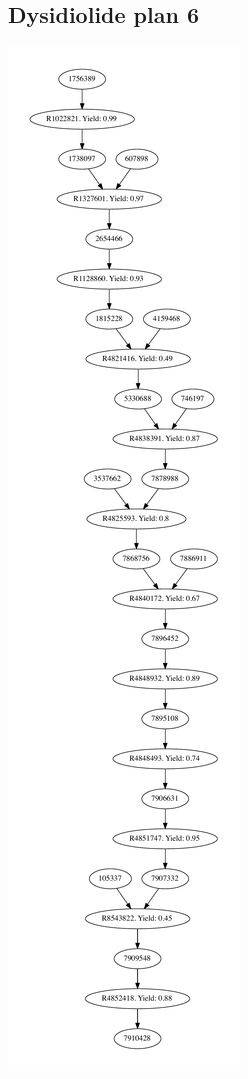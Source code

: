 \documentclass[a4paper,10pt,titlepage]{paper}
\begin{document}
\subsection{Dysidiolide plan 6}
\centering
\includegraphics[scale=0.4]{Synteseplaner/Dysidiolide/plan6.pdf}
\label{Appendix::Dysidiolide6}
\end{document}
